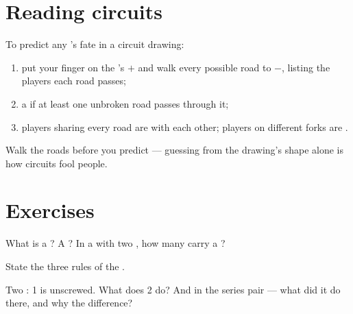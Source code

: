 \section{Reading circuits}

\begin{method}\label{met:g5:series-parallel-circuits:follow}
To predict any 's fate in a circuit drawing:
\begin{enumerate}
  \item put your finger on the 's $+$ and walk every
        possible road to $-$, listing the players each road
        passes;
  \item a   if at least one unbroken road passes through
        it;
  \item players sharing every road are  with each other;
        players on different forks are .
\end{enumerate}
Walk the roads before you predict --- guessing from the drawing's
shape alone is how circuits fool people.
\end{method}

\section{Exercises}

\begin{exercise}[$\star$]\label{exo:g5:series-parallel-circuits:1}
What is a ? A ? In a  with two ,
how many  carry a ?
\end{exercise}

\begin{exercise}[$\star$]\label{exo:g5:series-parallel-circuits:2}
State the three rules of the .
\end{exercise}

\begin{exercise}[$\star$]\label{exo:g5:series-parallel-circuits:3}
Two  :  1 is unscrewed. What does  2 do?
And in the series pair --- what did it do there, and why the
difference?
\end{exercise}

